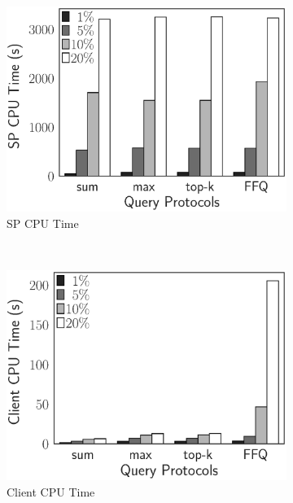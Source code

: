 \begin{figure}[t]
  \centering
  \begin{subfigure}[b]{.33\linewidth}
    \centering
    \includegraphics[height=\ht\figbox]{exp-figs/aggregate-queries/tpch_sp.eps}
    \caption{SP CPU Time}
  \end{subfigure}~%
  \begin{subfigure}[b]{.33\linewidth}
    \centering
    \includegraphics[height=\ht\figbox]{exp-figs/aggregate-queries/tpch_client.eps}
    \caption{Client CPU Time}
  \end{subfigure}~%
  \begin{subfigure}[b]{.33\linewidth}
    \centering

\end{subfigure}
\end{figure}
